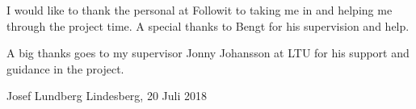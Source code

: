 
I would like to thank the personal at Followit to taking me in and helping me through the project time. A special thanks to Bengt for his supervision and help. 

A big thanks goes to my supervisor Jonny Johansson at LTU for his support and guidance in the project.

\begin{flushright}
Josef Lundberg
\newline
Lindesberg, 20 Juli 2018
\end{flushright}